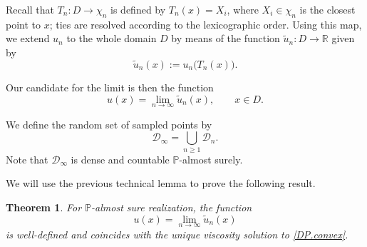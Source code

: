 \documentclass[11pt]{amsart}
\newtheorem{theorem}{Theorem}
\theoremstyle{definition}
\theoremstyle{remark}
\numberwithin{equation}{section}
\renewcommand{\P}{\mathbb{P}}
\newcommand{\Domain}{\mathcal{D}}
\begin{document}
	
Recall that $T_n\colon D \to \chi_n$ is defined by $T_n(x)=X_i$, where $X_i\in\chi_n$ is the closest point to $x$; ties are resolved according to the lexicographic order. Using this map, we extend $u_n$ to the whole domain $D$ by means of the function $\tilde{u}_n \colon D \to \mathbb{R}$ given by
\[
\tilde{u}_n(x) := u_n\bigl(T_n(x)\bigr).
\]

Our candidate for the limit is then the function
\[
u(x) = \lim_{n\to \infty} \tilde{u}_n(x), \qquad x\in D.
\]

We define the random set of sampled points by
\[
\Domain_{\infty} = \bigcup_{n\geq 1}\Domain_{n}.
\]
Note that $\Domain_{\infty}$ is dense and countable $\mathbb{P}$-almost surely.

We will use the previous technical lemma to prove the following result. 


\begin{theorem}
	For $\P$-almost sure realization, the function 
	\[
	u(x) = \lim_{n\to \infty} \tilde{u}_n(x)
	\]
	is well-defined and coincides with the unique viscosity solution to \eqref{DP.convex}.
\end{theorem}
\end{document}
